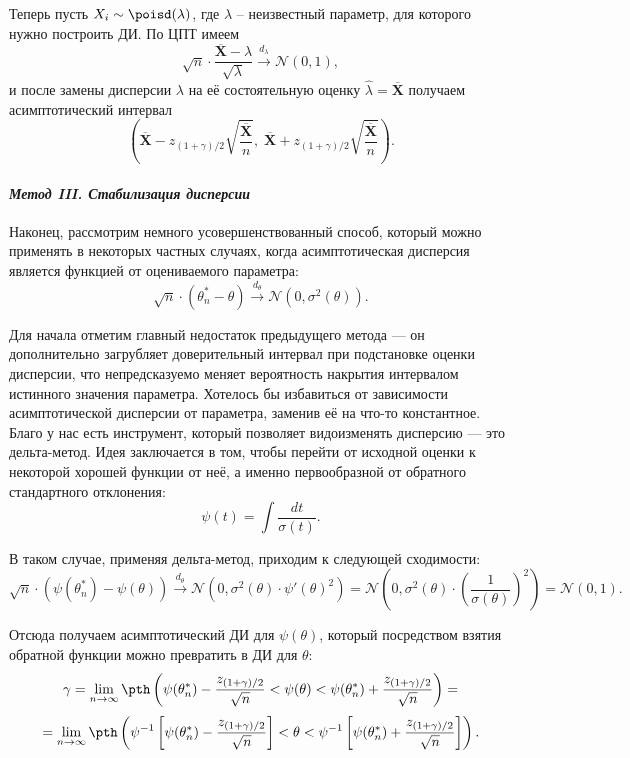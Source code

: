 \begin{example}
    Теперь пусть $X_i \sim \poisd(\lambda)$, где $\lambda$ -- неизвестный параметр, для которого нужно построить ДИ. По ЦПТ имеем
    \[
    \sqrt{n}\cdot\frac{\overline{\mathbf X} - \lambda}{\sqrt{\lambda}} \stackrel{d_{\lambda}}{\longrightarrow} \mathcal{N}(0, 1),
    \]
    и после замены дисперсии $\lambda$ на её состоятельную оценку $\widehat{\lambda} = \overline{\mathbf X}$ получаем асимптотический интервал
    \[
    \left(\overline{\mathbf X} - z_{(1+\gamma)/2}\sqrt{\frac{\overline{\mathbf X}}{n}},\; \overline{\mathbf X} + z_{(1+\gamma)/2}\sqrt{\frac{\overline{\mathbf X}}{n}}\right).
    \]
\end{example}

\paragraph{\textit{Метод III. Стабилизация дисперсии}}

Наконец, рассмотрим немного усовершенствованный способ, который можно применять в некоторых частных случаях, когда асимптотическая дисперсия является функцией от оцениваемого параметра:
\[
\sqrt{n} \cdot (\theta^*_n - \theta) \stackrel{d_{\theta}}{\to} \mathcal{N}(0, \sigma^2(\theta)).
\]

Для начала отметим главный недостаток предыдущего метода --- он дополнительно загрубляет доверительный интервал при подстановке оценки дисперсии, что непредсказуемо меняет вероятность накрытия интервалом истинного значения параметра. Хотелось бы избавиться от зависимости асимптотической дисперсии от параметра, заменив её на что-то константное. Благо у нас есть инструмент, который позволяет видоизменять дисперсию --- это дельта-метод. Идея заключается в том, чтобы перейти от исходной оценки к некоторой хорошей функции от неё, а именно первообразной от обратного стандартного отклонения:
\[
\psi(t) = \int \frac{dt}{\sigma(t)}.
\]

В таком случае, применяя дельта-метод, приходим к следующей сходимости:
\[
\sqrt{n} \cdot (\psi(\theta^*_n) - \psi(\theta)) \stackrel{d_{\theta}}{\to} \mathcal{N}(0, \sigma^2(\theta) \cdot \psi'(\theta)^2) = \mathcal{N}\left(0, \sigma^2(\theta) \cdot \left(\frac{1}{\sigma(\theta)}\right)^2\right) = \mathcal{N}(0, 1).
\]

Отсюда получаем асимптотический ДИ для $\psi(\theta)$, который посредством взятия обратной функции можно превратить в ДИ для $\theta$:
\[
\gamma = \lim_{n \to \infty} \pth\left(\psi(\theta^*_n) - \frac{z_{(1+\gamma)/2}}{\sqrt{n}} < \psi(\theta) < \psi(\theta^*_n) + \frac{z_{(1+\gamma)/2}}{\sqrt{n}}\right)  = 
\]
\[
= \lim_{n \to \infty} \pth\left(\psi^{-1}\left[\psi(\theta^*_n) - \frac{z_{(1+\gamma)/2}}{\sqrt{n}}\right] < \theta < \psi^{-1}\left[\psi(\theta^*_n) + \frac{z_{(1+\gamma)/2}}{\sqrt{n}}\right]\right).
\]


